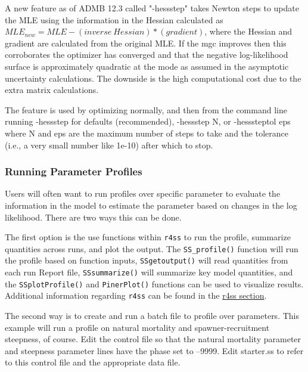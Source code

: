 A new feature as of ADMB 12.3 called "-hess{\textunderscore}step" takes Newton steps to update the MLE using the information in the Hessian calculated as $MLE_{new}=MLE-(inverse~Hessian)*(gradient)$, where the Hessian and gradient are calculated from the original MLE. If the mgc improves then this corroborates the optimizer has converged and that the negative log-likelihood surface is approximately quadratic at the mode as assumed in the asymptotic uncertainty calculations. The downside is the high computational cost due to the extra matrix calculations.

The feature is used by optimizing normally, and then from the command line running -hess{\textunderscore}step for defaults (recommended), -hess{\textunderscore}step N, or -hess{\textunderscore}step{\textunderscore}tol eps where N and eps are the maximum number of steps to take and the tolerance (i.e., a very small number like 1e-10) after which to stop.

\subsubsection{Running Parameter Profiles}
Users will often want to run profiles over specific parameter to evaluate the information in the model to estimate the parameter based on changes in the log likelihood.  There are two ways this can be done.

The first option is the use functions within \texttt{r4ss} to run the profile, summarize quantities across runs, and plot the output.  The \texttt{SS\_profile()} function will run the profile based on function inputs, \texttt{SSgetoutput()} will read quantities from each run Report file, \texttt{SSsummarize()} will summarize key model quantities, and the \texttt{SSplotProfile()} and \texttt{PinerPlot()} functions can be used to visualize results.  Additional information regarding \texttt{r4ss} can be found in the \hyperref[sec:r4ss]{r4ss section}. 

The second way is to create and run a batch file to profile over parameters. This example will run a profile on natural mortality and spawner-recruitment steepness, of course.  Edit the control file so that the natural mortality parameter and steepness parameter lines have the phase set to –9999.  Edit starter.ss to refer to this control file and the appropriate data file.

